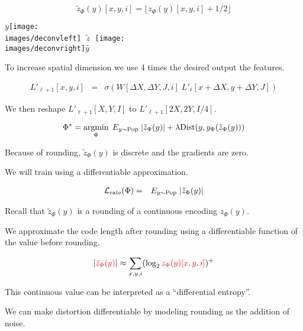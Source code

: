 {\vfill
$$\tilde{z}_\Phi(y)[x,y,i] = \lfloor z_\Phi(y)[x,y,i] + 1/2 \rfloor$$


\centerline{$y$\texttt{[image: \\images/deconvleft]} $\;\tilde{z}\;$ \texttt{[image: \\images/deconvright]}$\hat{y}$}


\vfill
To increase spatial dimension we use 4 times the desired output the features.

\begin{eqnarray*}
  L'_{\ell+1}[x,y,i] & = & \sigma\left(W[\Delta X, \Delta Y, J,i]\; L'_\ell[x + \Delta X, y + \Delta Y, J]\right)
\end{eqnarray*}

\vfill
We then reshape $L'_{\ell+1}[X,Y,I]$ to $L'_{\ell+1}[2X,2Y,I/4]$.


$$\Phi^* = \operatorname*{argmin}_\Phi \;E_{y \sim \mathrm{Pop}}\;|\tilde{z}_\Phi(y)| + \lambda \mathrm{Dist}(y,y_\Phi(\tilde{z}_\Phi(y)))$$

\vfill
Because of rounding, $\tilde{z}_\Phi(y)$ is discrete and the gradients are zero.

\vfill
We will train using a differentiable approximation.


\begin{eqnarray*}
{\cal L}_{\mathrm{rate}}(\Phi) & = & E_{y \sim \mathrm{Pop}}\;|\tilde{z}_\Phi(y)|
\end{eqnarray*}

\vfill
Recall that {\color{red} $\tilde{z}_\Phi(y)$} is a rounding of a continuous encoding {\color{red} $z_\Phi(y)$}.

\vfill
We approximate the code length after rounding using a differentiable function of the value before rounding.

\vfill
{\color{red} $$|{\color{red} \tilde{z}_\Phi(y)}| \approx \sum_{x,y,i} (\log_2 {\color{red} z_\Phi(y)[x,y,i]})^+$$}

This continuous value can be interpreted as a ``differential entropy''.


We can make distortion differentiable by modeling rounding as the addition of noise.

}
